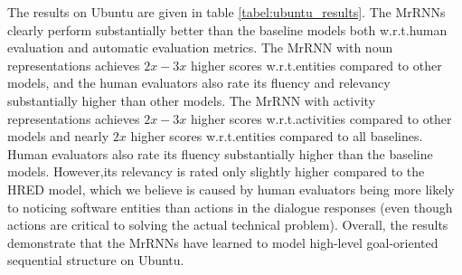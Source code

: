 \documentclass{article}
\begin{document}
The results on Ubuntu are given in table \ref{tabel:ubuntu_results}.
The MrRNNs clearly perform substantially better than the baseline models both w.r.t.\@ human evaluation and automatic evaluation metrics.
The MrRNN with noun representations achieves $2x-3x$ higher scores w.r.t.\@ entities compared to other models,
and the human evaluators also rate its fluency and relevancy substantially higher than other models.
The MrRNN with activity representations achieves $2x-3x$ higher scores w.r.t.\@ activities compared to other models and nearly $2x$ higher scores w.r.t.\@ entities compared to all baselines.
Human evaluators also rate its fluency substantially higher than the baseline models. 
However,its relevancy is rated only slightly higher compared to the HRED model, which we believe is caused by human evaluators being more likely to noticing software entities than actions in the dialogue responses (even though actions are critical to solving the actual technical problem).
Overall, the results demonstrate that the MrRNNs have learned to model high-level goal-oriented sequential structure on Ubuntu.
\end{document}
